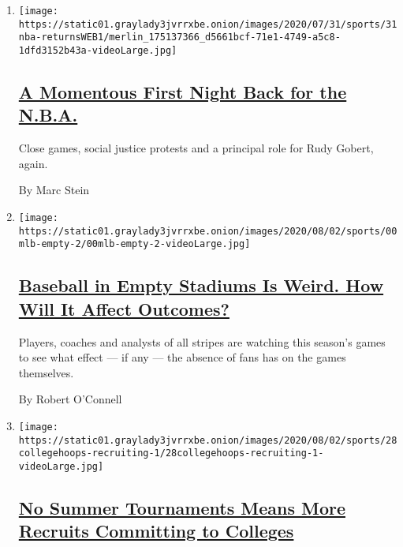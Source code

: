 \begin{enumerate}
\def\labelenumi{\arabic{enumi}.}
\item
  \texttt{[image: https://static01.graylady3jvrrxbe.onion/images/2020/07/31/sports/31nba-returnsWEB1/merlin\_175137366\_d5661bcf-71e1-4749-a5c8-1dfd3152b43a-videoLarge.jpg]}

  \hypertarget{a-momentous-first-night-back-for-the-nba}{%
  \subsection{\texorpdfstring{\href{/2020/07/31/sports/basketball/nba-opening-night.html}{A
  Momentous First Night Back for the
  N.B.A.}}{A Momentous First Night Back for the N.B.A.}}\label{a-momentous-first-night-back-for-the-nba}}

  Close games, social justice protests and a principal role for Rudy
  Gobert, again.

  By Marc Stein
\item
  \texttt{[image: https://static01.graylady3jvrrxbe.onion/images/2020/08/02/sports/00mlb-empty-2/00mlb-empty-2-videoLarge.jpg]}

  \hypertarget{baseball-in-empty-stadiums-is-weird-how-will-it-affect-outcomes}{%
  \subsection{\texorpdfstring{\href{/2020/07/31/sports/baseball/baseball-empty-stadiums-effects.html}{Baseball
  in Empty Stadiums Is Weird. How Will It Affect
  Outcomes?}}{Baseball in Empty Stadiums Is Weird. How Will It Affect Outcomes?}}\label{baseball-in-empty-stadiums-is-weird-how-will-it-affect-outcomes}}

  Players, coaches and analysts of all stripes are watching this
  season's games to see what effect --- if any --- the absence of fans
  has on the games themselves.

  By Robert O'Connell
\item
  \texttt{[image: https://static01.graylady3jvrrxbe.onion/images/2020/08/02/sports/28collegehoops-recruiting-1/28collegehoops-recruiting-1-videoLarge.jpg]}

  \hypertarget{no-summer-tournaments-means-more-recruits-committing-to-colleges}{%
  \subsection{\texorpdfstring{\href{/2020/07/30/sports/ncaabasketball/college-basketball-recruiting.html}{No
  Summer Tournaments Means More Recruits Committing to
  Colleges}}{No Summer Tournaments Means More Recruits Committing to Colleges}}\label{no-summer-tournaments-means-more-recruits-committing-to-colleges}}


\end{enumerate}
